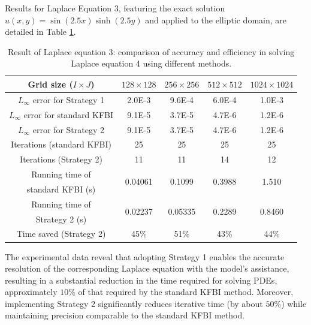 \documentclass{article}
\begin{document}
Results for Laplace Equation 3, featuring the exact solution $u(x, y) = \sin(2.5x) \sinh(2.5y)$ and applied to the elliptic domain, are detailed in Table \ref{label1_1_4}.
\begin{table}[ht]
    \centering
    \begin{tabular}{|c|c|c|c|c|} \hline 
         Grid size ($I\times J$) & $128 \times 128$ & $256 \times 256$ & $512 \times 512$ & $1024 \times 1024$ \\ \hline 
         $L_{\infty}$ error for Strategy 1 & 2.0E-3 & 9.6E-4 & 6.0E-4 & 1.0E-3 \\ \hline
         $L_{\infty}$ error for standard KFBI & 9.1E-5 & 3.7E-5 & 4.7E-6 & 1.2E-6 \\ \hline
         $L_{\infty}$ error for Strategy 2 & 9.1E-5 & 3.7E-5 & 4.7E-6 & 1.2E-6\\ \hline
         Iterations (standard KFBI) &  25&  25&  25& 25\\ \hline 
         Iterations (Strategy 2)&  11&  11&  14& 12\\ \hline 
         
         Running time of 
         & \multirow{2}{*}{0.04061\bigstrut}
         & \multirow{2}{*}{0.1099\bigstrut}
         & \multirow{2}{*}{0.3988\bigstrut}
         & \multirow{2}{*}{1.510\bigstrut} \\
         standard KFBI (s) & & & & \\ \hline
         
         Running time of 
         & \multirow{2}{*}{0.02237\bigstrut}
         & \multirow{2}{*}{0.05335\bigstrut}
         & \multirow{2}{*}{0.2289\bigstrut}
         & \multirow{2}{*}{0.8460\bigstrut} \\
         Strategy 2 (s) & & & & \\ \hline
         
         Time saved (Strategy 2) & 45\%& 51\%& 43\%& 44\%\\ \hline
    \end{tabular}
    \caption{Result of Laplace equation 3: comparison of accuracy and efficiency in solving Laplace equation 4 using different methods.}
    \label{label1_1_4}
\end{table}

The experimental data reveal that adopting Strategy 1 enables the accurate resolution of the corresponding Laplace equation with the model's assistance, resulting in a substantial reduction in the time required for solving PDEs, approximately $10\%$ of that required by the standard KFBI method. Moreover, implementing Strategy 2 significantly reduces iterative time (by about $50\%$) while maintaining precision comparable to the standard KFBI method.
\end{document}
